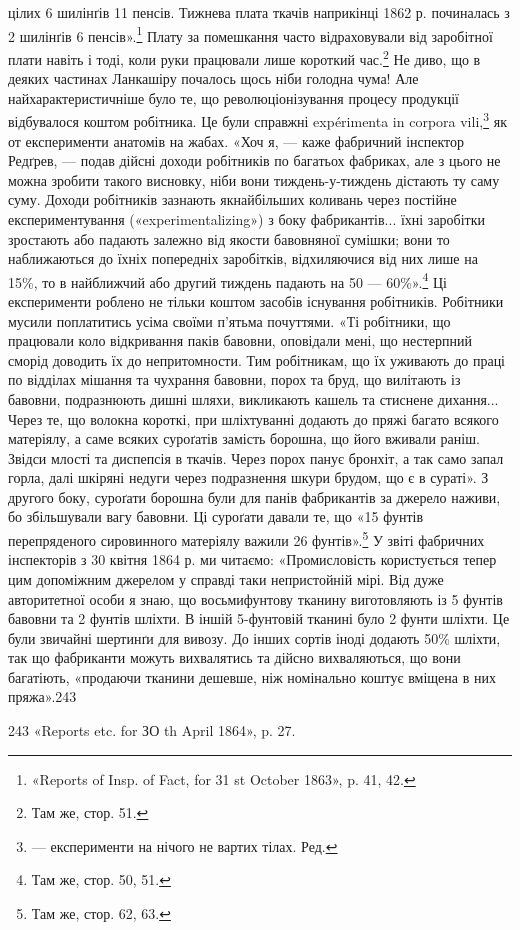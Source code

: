 цілих 6 шилінґів 11 пенсів. Тижнева плата ткачів наприкінці
1862 р. починалась з 2 шилінґів 6 пенсів».\footnote{
«Reports of Insp. of Fact, for 31 st October 1863», p. 41, 42.
} Плату за помешкання
часто відраховували від заробітної плати навіть і тоді, коли
руки працювали лише короткий час.\footnote{
Там же, стор. 51.
} Не диво, що в деяких
частинах Ланкашіру почалось щось ніби голодна чума! Але найхарактеристичніше
було те, що революціонізування процесу продукції
відбувалося коштом робітника. Це були справжні expérimenta
in corpora vili,\footnote*{
— експерименти на нічого не вартих тілах. Ред.
} як от експерименти анатомів на жабах.
«Хоч я, — каже фабричний інспектор Редґрев, — подав дійсні
доходи робітників по багатьох фабриках, але з цього не можна
зробити такого висновку, ніби вони тиждень-у-тиждень дістають
ту саму суму. Доходи робітників зазнають якнайбільших
коливань через постійне експериментування («experimentalizing»)
з боку фабрикантів... їхні заробітки зростають або падають залежно
від якости бавовняної сумішки; вони то наближаються
до їхніх попередніх заробітків, відхиляючися від них лише на
15\%, то в найближчий або другий тиждень падають на 50 —
60\%».\footnote{
Там же, стор. 50, 51.
} Ці експерименти роблено не тільки коштом засобів
існування робітників. Робітники мусили поплатитись усіма своїми
п’ятьма почуттями. «Ті робітники, що працювали коло відкривання
паків бавовни, оповідали мені, що нестерпний сморід
доводить їх до непритомности. Тим робітникам, що їх уживають
до праці по відділах мішання та чухрання бавовни, порох та бруд,
що вилітають із бавовни, подразнюють дишні шляхи, викликають
кашель та стиснене дихання... Через те, що волокна короткі,
при шліхтуванні додають до пряжі багато всякого матеріялу, а
саме всяких суроґатів замість борошна, що його вживали раніш.
Звідси млості та диспепсія в ткачів. Через порох панує бронхіт,
а так само запал горла, далі шкіряні недуги через подразнення
шкури брудом, що є в сураті». З другого боку, суроґати борошна
були для панів фабрикантів за джерело наживи, бо збільшували
вагу бавовни. Ці суроґати давали те, що «15 фунтів перепряденого
сировинного матеріялу важили 26 фунтів».\footnote{
Там же, стор. 62, 63.
} У звіті фабричних
інспекторів з 30 квітня 1864 р. ми читаємо: «Промисловість
користується тепер цим допоміжним джерелом у справді таки
непристойній мірі. Від дуже авторитетної особи я знаю, що восьмифунтову
тканину виготовляють із 5 фунтів бавовни та 2 фунтів
шліхти. В іншій 5-фунтовій тканині було 2 фунти шліхти.
Це були звичайні шертинґи для вивозу. До інших сортів іноді
додають 50\% шліхти, так що фабриканти можуть вихвалятись
та дійсно вихваляються, що вони багатіють, «продаючи тканини
дешевше, ніж номінально коштує вміщена в них пряжа».243

243 «Reports etc. for ЗО th April 1864», p. 27.
